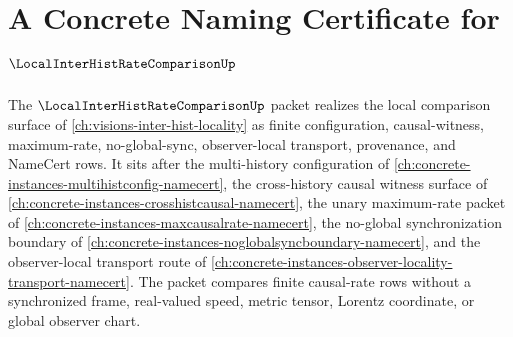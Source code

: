\chapter{A Concrete Naming Certificate for $\LocalInterHistRateComparisonUp$}
\label{ch:concrete-instances-local-interhist-rate-comparison-namecert}

The $\LocalInterHistRateComparisonUp$ packet realizes the local comparison surface of \autoref{ch:visions-inter-hist-locality} as finite configuration, causal-witness, maximum-rate, no-global-sync, observer-local transport, provenance, and NameCert rows. It sits after the multi-history configuration of \autoref{ch:concrete-instances-multihistconfig-namecert}, the cross-history causal witness surface of \autoref{ch:concrete-instances-crosshistcausal-namecert}, the unary maximum-rate packet of \autoref{ch:concrete-instances-maxcausalrate-namecert}, the no-global synchronization boundary of \autoref{ch:concrete-instances-noglobalsyncboundary-namecert}, and the observer-local transport route of \autoref{ch:concrete-instances-observer-locality-transport-namecert}. The packet compares finite causal-rate rows without a synchronized frame, real-valued speed, metric tensor, Lorentz coordinate, or global observer chart.

